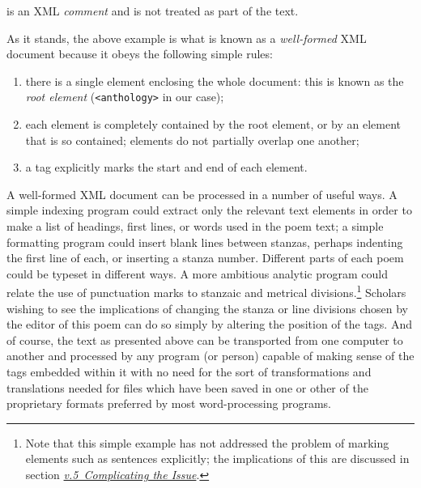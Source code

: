 \par\egroup 
 is an XML \textit{comment} and is not treated as part of the text.\par
As it stands, the above example is what is known as a \textit{well-formed} XML document because it obeys the following simple rules: \begin{enumerate}
\item there is a single element enclosing the whole document: this is known as the \textit{root element} (\texttt{<anthology>} in our case);
\item each element is completely contained by the root element, or by an element that is so contained; elements do not partially overlap one another;
\item a tag explicitly marks the start and end of each element.
\end{enumerate}\par
A well-formed XML document can be processed in a number of useful ways. A simple indexing program could extract only the relevant text elements in order to make a list of headings, first lines, or words used in the poem text; a simple formatting program could insert blank lines between stanzas, perhaps indenting the first line of each, or inserting a stanza number. Different parts of each poem could be typeset in different ways. A more ambitious analytic program could relate the use of punctuation marks to stanzaic and metrical divisions.\footnote{Note that this simple example has not addressed the problem of marking elements such as sentences explicitly; the implications of this are discussed in section \textit{\hyperref[SG152]{v.5\ Complicating the Issue}}.} Scholars wishing to see the implications of changing the stanza or line divisions chosen by the editor of this poem can do so simply by altering the position of the tags. And of course, the text as presented above can be transported from one computer to another and processed by any program (or person) capable of making sense of the tags embedded within it with no need for the sort of transformations and translations needed for files which have been saved in one or other of the proprietary formats preferred by most word-processing programs.\par
